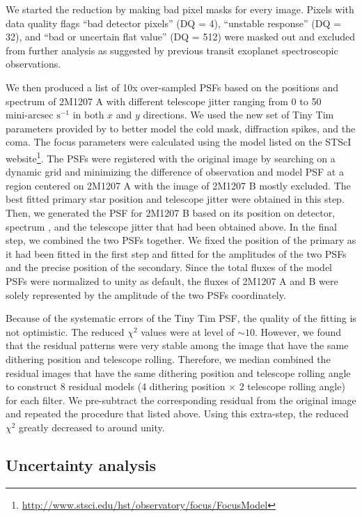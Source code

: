 \documentclass[apj]{emulateapj}
\begin{document}
We started the reduction by making bad pixel masks for every
image. Pixels with data quality flags ``bad detector pixels'' (DQ = 4),
``unstable response'' (DQ = 32), and ``bad or uncertain flat value'' (DQ =
512) were masked out and excluded from further analysis as suggested
by previous transit exoplanet
spectroscopic observations\citep[e.g.][]{Berta2012, Kreidberg2014}.

We then produced a list of 10x over-sampled PSFs based on the
positions and spectrum \citep{Bonnefoy2014} of 2M1207 A with different
telescope jitter ranging from 0 to 50 $\mbox{mini-arcsec s}^{-1}$ in
both $x$ and $y$ directions. We used the new set of Tiny Tim
parameters provided by \cite{Biretta2014} to better model the cold
mask, diffraction spikes, and the coma. The focus parameters were
calculated using the model listed on the STScI
website\footnote{\url{http://www.stsci.edu/hst/observatory/focus/FocusModel}}. The
PSFs were registered with the original image by searching on a dynamic
grid and minimizing the difference of observation and model PSF at a
region centered on 2M1207 A with the image of 2M1207 B mostly
excluded. The best fitted primary star position and telescope jitter
were obtained in this step. Then, we generated the PSF for 2M1207 B
based on its position on detector, spectrum \citep{Patience2010}, and
the telescope jitter that had been obtained above. In the final step,
we combined the two PSFs together. We fixed the position of the
primary as it had been fitted in the first step and fitted for the
amplitudes of the two PSFs and the precise position of the
secondary. Since the total fluxes of the model PSFs were normalized to
unity as default, the fluxes of 2M1207 A and B were solely represented
by the amplitude of the two PSFs coordinately.

Because of the systematic errors of the Tiny Tim PSF, the quality of the
fitting is not optimistic. The reduced $\chi^{2}$ values were at level
of $\sim10$. However, we found that the residual patterns were very
stable among the image that have the same dithering position and
telescope rolling. Therefore, we median combined the residual images
that have the same dithering position and telescope rolling angle to
construct 8 residual models (4 dithering position $\times$ 2 telescope
rolling angle) for each filter. We pre-subtract the corresponding
residual from the original image and repeated the procedure that
listed above. Using this extra-step, the reduced $\chi^{2}$
greatly decreased to around unity.


\subsection{Uncertainty analysis}
\end{document}
